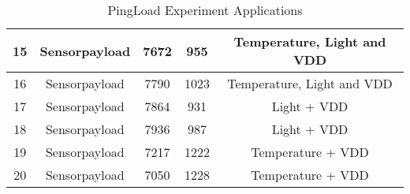 \begin{table}[!ht]
\begin{tabular}{|c|c|c|c|c|}
15                   & Sensorpayload        & 7672          & 955                    & Temperature, Light and VDD \\ \hline
16                   & Sensorpayload        & 7790          & 1023                   & Temperature, Light and VDD \\ \hline
17                   & Sensorpayload        & 7864          & 931                    & Light + VDD                \\ \hline
18                   & Sensorpayload        & 7936          & 987                    & Light + VDD                \\ \hline
19                   & Sensorpayload        & 7217          & 1222                   & Temperature + VDD          \\ \hline
20                   & Sensorpayload        & 7050          & 1228                   & Temperature + VDD          \\ \hline
\end{tabular}
\caption{PingLoad Experiment Applications}
\label{PingLoadApps}
\end{table}
